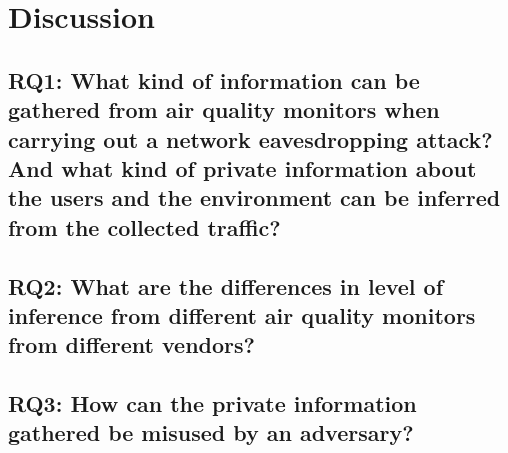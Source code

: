 \chapter{Discussion}
\section{RQ1: What kind of information can be gathered from air quality monitors when carrying out a network eavesdropping attack? And what kind of private information about the users and the environment can be inferred from the collected traffic?}
\section{RQ2: What are the differences in level of inference from different air quality monitors from different vendors?}
\section{RQ3: How can the private information gathered be misused by an adversary?}